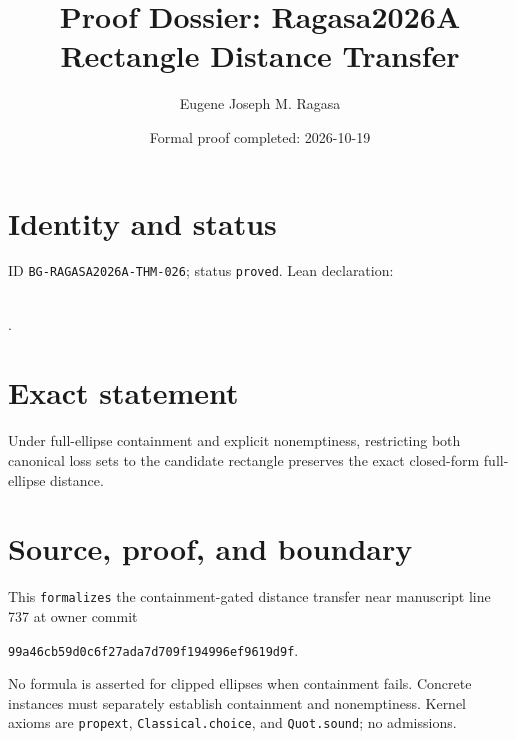 \documentclass[11pt]{article}
\title{Proof Dossier: Ragasa2026A Rectangle Distance Transfer}\author{Eugene Joseph M. Ragasa}\date{Formal proof completed: 2026-10-19}
\begin{document}
\maketitle
\section{Identity and status}
ID \texttt{BG-RAGASA2026A-THM-026}; status \texttt{proved}. Lean declaration:
\par{}\\
{\tiny{}}.
\section{Exact statement}
Under full-ellipse containment and explicit nonemptiness, restricting both canonical loss
sets to the candidate rectangle preserves the exact closed-form full-ellipse distance.
\section{Source, proof, and boundary}
This \texttt{formalizes} the containment-gated distance transfer near manuscript line 737
at owner commit
\begin{center}\small\texttt{99a46cb59d0c6f27ada7d709f194996ef9619d9f}.\end{center}
No formula is asserted for clipped ellipses when containment fails. Concrete instances
must separately establish containment and nonemptiness. Kernel axioms are
\texttt{propext}, \texttt{Classical.choice}, and \texttt{Quot.sound}; no admissions.
\end{document}
